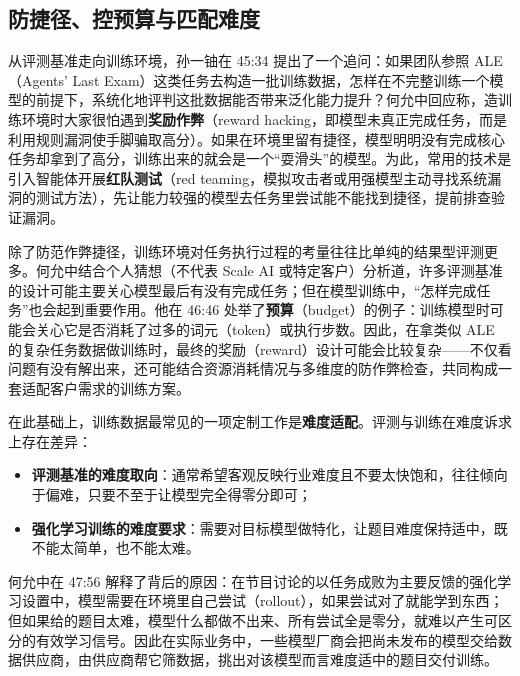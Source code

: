 \documentclass[UTF8,a4paper,11pt,fontset=fandol]{ctexart}
\begin{document}
\subsection{防捷径、控预算与匹配难度}
从评测基准走向训练环境，孙一铀在 45:34 提出了一个追问：如果团队参照 ALE（Agents' Last Exam）这类任务去构造一批训练数据，怎样在不完整训练一个模型的前提下，系统化地评判这批数据能否带来泛化能力提升？何允中回应称，造训练环境时大家很怕遇到\textbf{奖励作弊}（reward hacking，即模型未真正完成任务，而是利用规则漏洞使手脚骗取高分）。如果在环境里留有捷径，模型明明没有完成核心任务却拿到了高分，训练出来的就会是一个“耍滑头”的模型。为此，常用的技术是引入智能体开展\textbf{红队测试}（red teaming，模拟攻击者或用强模型主动寻找系统漏洞的测试方法），先让能力较强的模型去任务里尝试能不能找到捷径，提前排查验证漏洞。

除了防范作弊捷径，训练环境对任务执行过程的考量往往比单纯的结果型评测更多。何允中结合个人猜想（不代表 Scale AI 或特定客户）分析道，许多评测基准的设计可能主要关心模型最后有没有完成任务；但在模型训练中，“怎样完成任务”也会起到重要作用。他在 46:46 处举了\textbf{预算}（budget）的例子：训练模型时可能会关心它是否消耗了过多的词元（token）或执行步数。因此，在拿类似 ALE 的复杂任务数据做训练时，最终的奖励（reward）设计可能会比较复杂——不仅看问题有没有解出来，还可能结合资源消耗情况与多维度的防作弊检查，共同构成一套适配客户需求的训练方案。

在此基础上，训练数据最常见的一项定制工作是\textbf{难度适配}。评测与训练在难度诉求上存在差异：
\begin{itemize}
\item \textbf{评测基准的难度取向}：通常希望客观反映行业难度且不要太快饱和，往往倾向于偏难，只要不至于让模型完全得零分即可；
\item \textbf{强化学习训练的难度要求}：需要对目标模型做特化，让题目难度保持适中，既不能太简单，也不能太难。
\end{itemize}
何允中在 47:56 解释了背后的原因：在节目讨论的以任务成败为主要反馈的强化学习设置中，模型需要在环境里自己尝试（rollout），如果尝试对了就能学到东西；但如果给的题目太难，模型什么都做不出来、所有尝试全是零分，就难以产生可区分的有效学习信号。因此在实际业务中，一些模型厂商会把尚未发布的模型交给数据供应商，由供应商帮它筛数据，挑出对该模型而言难度适中的题目交付训练。
\end{document}
